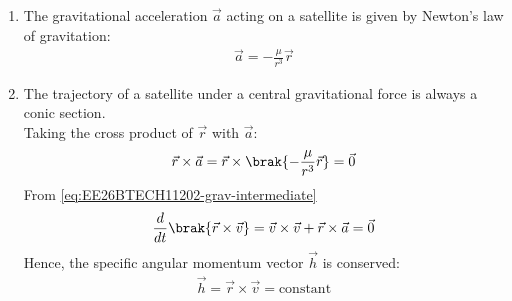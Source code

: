 \begin{enumerate}[label=\thesubsection.\arabic*, ref=\thesubsection.\theenumi]
\begin{align}
\varepsilon = \frac{v^2}{2} - \frac{\mu}{r} \label{eq:EE26BTECH11202-energy}
\end{align}
where
\begin{align}
	r=\norm{\vec{r}}, v=\norm{\vec{v}}
\end{align}
\item The gravitational acceleration $\vec{a}$ acting on a satellite is given by Newton's law of gravitation:
\begin{align}
\vec{a} = -\frac{\mu}{r^3}\vec{r}
\label{eq:EE26BTECH11202-grav_acc}
\end{align}
\item The trajectory of a satellite under a central gravitational force is always a conic section. \\
\solution
Taking the cross product of $\vec{r}$ with $\vec{a}$:
\begin{align}
	\vec{r} \times \vec{a} = \vec{r} \times \brak{-\frac{\mu}{r^3}\vec{r}} = \vec{0} \label{eq:EE26BTECH11202-grav-intermediate}
\end{align}
From \eqref{eq:EE26BTECH11202-grav-intermediate}
\begin{align}\frac{d}{dt}\brak{\vec{r} \times \vec{v}} = \vec{v} \times \vec{v} + \vec{r} \times \vec{a} = \vec{0}
\end{align}
Hence, the specific angular momentum vector $\vec{h}$ is conserved:
\begin{align}
\vec{h} = \vec{r} \times \vec{v} = \text{constant}
\label{eq:EE26BTECH11202-ang_mom}
\end{align}


\end{enumerate}
